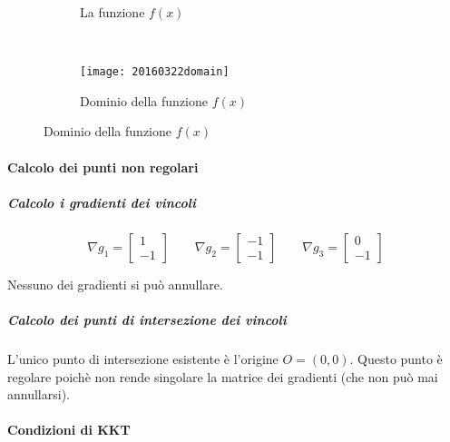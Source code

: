 \documentclass[\main/main.tex]{subfiles}
\begin{document}
\begin{figure}
  \begin{subfigure}{0.45\textwidth}
    \caption{La funzione $f(x)$}
    \label{func_2}
  \end{subfigure}
  ~
  \begin{subfigure}{0.45\textwidth}
    \texttt{[image: 20160322domain]}
    \caption{Dominio della funzione $f(x)$}
  \end{subfigure}
\end{figure}

\paragraph*{Calcolo dei punti non regolari}

\subparagraph*{Calcolo i gradienti dei vincoli}

\[
  \nabla g_1 = \begin{bmatrix}
    1 \\
    -1
  \end{bmatrix}
  \qquad
  \nabla g_2 = \begin{bmatrix}
    -1 \\
    -1
  \end{bmatrix}
  \qquad
  \nabla g_3 = \begin{bmatrix}
    0 \\
    -1
  \end{bmatrix}
\]

Nessuno dei gradienti si può annullare.

\subparagraph*{Calcolo dei punti di intersezione dei vincoli}
L'unico punto di intersezione esistente è l'origine $O=(0,0)$. Questo punto è regolare poichè non rende singolare la matrice dei gradienti (che non può mai annullarsi).

\paragraph*{Condizioni di KKT}
\end{document}
